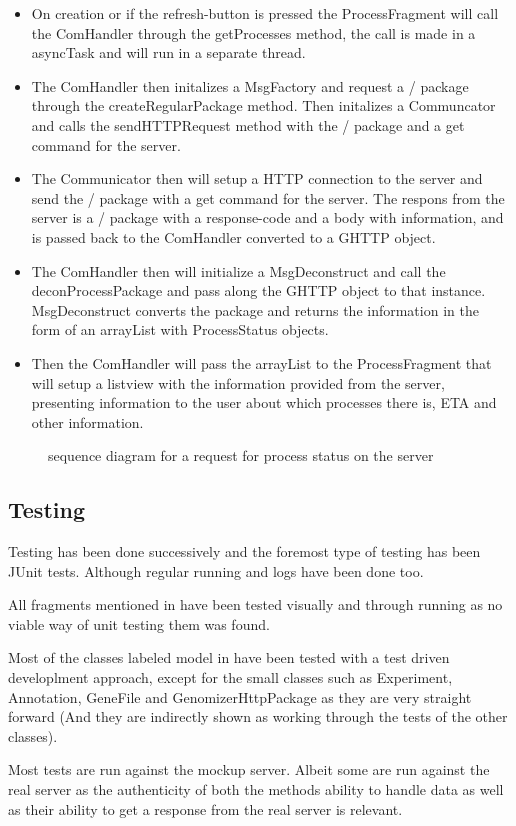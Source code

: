     \begin{itemize}
    	
        \item
        	On creation or if the refresh-button is pressed the ProcessFragment will call the ComHandler through the getProcesses method, the call is made in a asyncTask and will run in a separate thread.
       	\item
        	The ComHandler then initalizes a MsgFactory and request a \json/ package through the createRegularPackage method. Then initalizes a Communcator and calls the sendHTTPRequest method with the \json/ package and a get command for the server.
      	\item
        	The Communicator then will setup a HTTP connection to the server and send the \json/ package with a get command for the server. The respons from the server is a \json/ package with a response-code and a body with information, and is passed back to the ComHandler converted to a GHTTP object.
       	\item
        	The ComHandler then will initialize a MsgDeconstruct and call the deconProcessPackage and pass along the GHTTP object to that instance. MsgDeconstruct converts the package and returns the information in the form of an arrayList with ProcessStatus objects.
      	\item
        	Then the ComHandler will pass the arrayList to the ProcessFragment that will setup a listview with the information provided from the server, presenting information to the user about which processes there is, ETA and other information.
            
    \end{itemize}
    
    \begin{figure}
        \caption{sequence diagram for a request for process status on the server}
        \label{fig:and_processseq}
    \end{figure}
\FloatBarrier


\subsection{Testing}
Testing has been done successively and the foremost type of testing has been JUnit tests. Although regular running and logs have been done too.

All fragments mentioned in  have been tested visually and through running as no viable way of unit testing them was found.

Most of the classes labeled model in  have been tested with a test driven developlment approach, except for the small classes such as Experiment, Annotation, GeneFile and GenomizerHttpPackage as they are very straight forward (And they are indirectly shown as working through the tests of the other classes).

Most tests are run against the mockup server. Albeit some are run against the real server as the authenticity of both the methods ability to handle data as well as their ability to get a response from the real server is relevant. 
